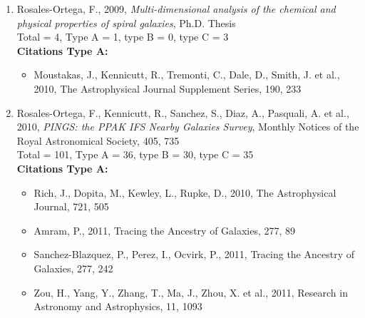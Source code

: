 \documentclass{letter}
\begin{document}
\begin{enumerate}
\begin{itemize}
\item Buenda, F., Cano, J., 2006, IEEE Transactions on Education, 49, 464
\item Jian, H., Sandnes, F., Huang, Y., Cai, L., Law, K., 2008, IEEE Transactions on Education, 51, 157
\item Trenas, M., Ramos, J., Gutierrez, E., Romero, S., Corbera, F., 2011, IEEE Transactions on Education, 54, 222
\end{itemize}
{\bf Citations Type B:}
\begin{itemize}
\item Rosales, F., Garcia, A., Rodriguez, S., Pedraza, J., Mendez, R. et al., 2008, IEEE Transactions on Education, 51, 174
\item Garcia, M., Rodriguez, S., Perez, A., Garcia, A., 2009, IEEE Transactions on Education, 52, 248
\end{itemize}
\item Rosales-Ortega, F., 2009, {\it Multi-dimensional analysis of the chemical and physical properties of spiral galaxies}, Ph.D. Thesis \\ 
Total = 4, Type A = 1, type B = 0, type C = 3 \\ 
{\bf Citations Type A:}
\begin{itemize}
\item Moustakas, J., Kennicutt, R., Tremonti, C., Dale, D., Smith, J. et al., 2010, The Astrophysical Journal Supplement Series, 190, 233
\end{itemize}
\item Rosales-Ortega, F., Kennicutt, R., Sanchez, S., Diaz, A., Pasquali, A. et al., 2010, {\it PINGS: the PPAK IFS Nearby Galaxies Survey}, Monthly Notices of the Royal Astronomical Society, 405, 735 \\ 
Total = 101, Type A = 36, type B = 30, type C = 35 \\ 
{\bf Citations Type A:}
\begin{itemize}
\item Rich, J., Dopita, M., Kewley, L., Rupke, D., 2010, The Astrophysical Journal, 721, 505
\item Amram, P., 2011, Tracing the Ancestry of Galaxies, 277, 89
\item Sanchez-Blazquez, P., Perez, I., Ocvirk, P., 2011, Tracing the Ancestry of Galaxies, 277, 242
\item Zou, H., Yang, Y., Zhang, T., Ma, J., Zhou, X. et al., 2011, Research in Astronomy and Astrophysics, 11, 1093

\end{itemize}
\end{enumerate}
\end{document}
